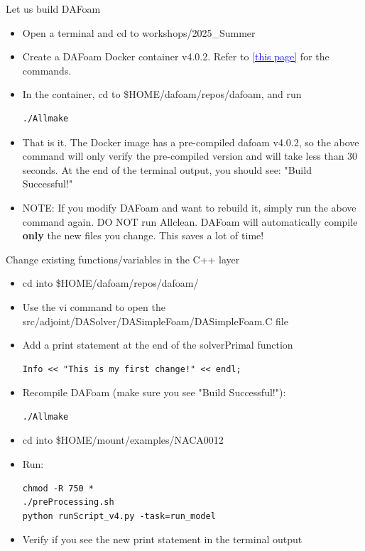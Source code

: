 \documentclass{bredelebeamer}
\begin{document}
\begin{frame}[fragile]{Let us build DAFoam}


\begin{itemize}
  \setlength\itemsep{0.5em}
  \item Open a terminal and cd to workshops/2025\_Summer
 \item Create a DAFoam Docker container v4.0.2. Refer to \href{https://dafoam.github.io/mydoc_get_started_run.html}{\textcolor{blue}{[this page]}} for the commands.
 \item In the container, cd to \$HOME/dafoam/repos/dafoam, and run
 \begin{lstlisting}
./Allmake
 \end{lstlisting}
 \item That is it. The Docker image has a pre-compiled dafoam v4.0.2, so the above command will only verify the pre-compiled version and will take less than 30 seconds. At the end of the terminal output, you should see: "Build Successful!"
 \item NOTE: If you modify DAFoam and want to rebuild it, simply run the above command again. DO NOT run Allclean. DAFoam will automatically compile \textbf{only} the new files you change. This saves a lot of time!
\end{itemize}
  
\end{frame}

\begin{frame}[fragile]{Change existing functions/variables in the C++ layer}

\begin{itemize}
  \item cd into \$HOME/dafoam/repos/dafoam/
  \item Use the vi command to open the src/adjoint/DASolver/DASimpleFoam/DASimpleFoam.C file
  \item Add a print statement at the end of the solverPrimal function
 \begin{lstlisting}
Info << "This is my first change!" << endl;
 \end{lstlisting}
  \item Recompile DAFoam (make sure you see "Build Successful!"):
 \begin{lstlisting}
./Allmake
 \end{lstlisting}
  \item cd into \$HOME/mount/examples/NACA0012
  \item Run:
\begin{lstlisting}
chmod -R 750 *
./preProcessing.sh
python runScript_v4.py -task=run_model
\end{lstlisting}
 \item Verify if you see the new print statement in the terminal output
    
\end{itemize}

\end{frame}
\end{document}
